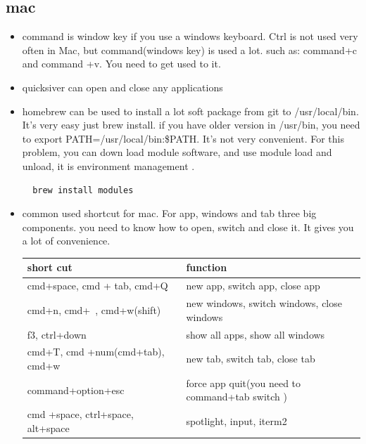 \documentclass[a4paper,11pt,twoside]{book}
\begin{document}
\subsection{mac}
\begin{itemize}
	
 	\item command is window key if you use a windows keyboard.  Ctrl is not used very often in Mac, but command(windows key) is used a lot. such as: command+c and command +v.  You need to get used to it. 
 
  	\item quicksiver can open and close any applications
  	
  	\item homebrew can be used to install a lot soft package from git to /usr/local/bin. It's very easy just brew install. 
  if you have older version in /usr/bin, you need to export PATH=/usr/local/bin:\$PATH. It's not very convenient. For this problem, you can down load module software, and use module load and unload, it is  environment management . 
  \begin{verbatim}
  brew install modules 
  \end{verbatim}
    
  	\item common used shortcut for mac. For app, windows and tab three big components. you need to know how to open, switch and close it.  It gives you a lot of convenience.  
  
  \begin{tabular}{|p{}|p{}|}
  	\hline
  	short cut& function  \\
  	\hline
  	cmd+space, cmd + tab, cmd+Q& new app,  switch app, close app \\
  	\hline
  	 cmd+n, cmd+~, cmd+w(shift) & new windows, switch windows, close windows \\
  	 
  	\hline
  	 f3, ctrl+down & show all apps, show all windows  \\
  	 
  	\hline
  	cmd+T, cmd +num(cmd+tab), cmd+w &new tab,  switch tab, close tab  \\
  	
  	\hline command+option+esc & force app quit(you need to command+tab switch ) \\
  	
  	\hline
  	cmd +space, ctrl+space, alt+space& spotlight, input, iterm2  \\
  

\end{tabular}
\end{itemize}
\end{document}
